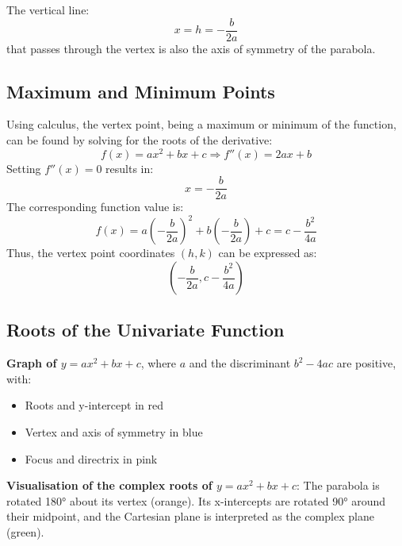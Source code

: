 The vertical line:
\[
x = h = -\frac{b}{2a}
\]
that passes through the vertex is also the axis of symmetry of the parabola.



\subsection{Maximum and Minimum Points}
\label{sss:maxi-056e}

Using calculus, the vertex point, being a maximum or minimum of the function, can be found
by solving for the roots of the derivative:
\[
f(x) = ax^2 + bx + c \Rightarrow f''(x) = 2ax + b
\]
Setting $f''(x) = 0$ results in:
\[
x = -\frac{b}{2a}
\]
The corresponding function value is:
\[
f(x) = a\left(-\frac{b}{2a}\right)^2 + b\left(-\frac{b}{2a}\right) + c = c - \frac{b^2}{4a}
\]
Thus, the vertex point coordinates $(h, k)$ can be expressed as:
\[
\left(-\frac{b}{2a}, c - \frac{b^2}{4a}\right)
\]

\subsection{Roots of the Univariate Function}
\label{sss:root-c66c}

\textbf{Graph of $y = ax^2 + bx + c$}, where $a$ and the discriminant $b^2 - 4ac$ are positive, with:

\begin{itemize}
    \item Roots and y-intercept in red
    \item Vertex and axis of symmetry in blue
    \item Focus and directrix in pink
\end{itemize}


\textbf{Visualisation of the complex roots of $y = ax^2 + bx + c$}: The parabola is rotated 180° about its vertex (orange). Its x-intercepts are rotated 90° around their midpoint, and the Cartesian plane is interpreted as the complex plane (green).


